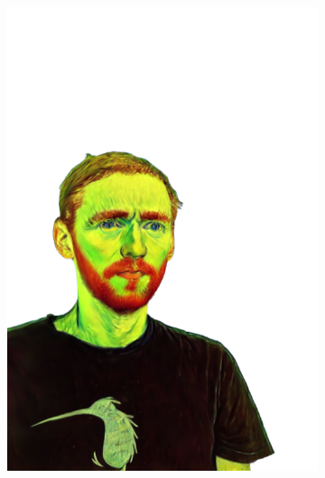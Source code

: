 \begin{figure}[ht]
\begin{subfigure}{0.08\linewidth}
        \includegraphics[width=\textwidth]{Figures/results/high/simon_vangogh/11_render.png}
	\end{subfigure}
	\begin{subfigure}{0.08\linewidth}%

\end{subfigure}
\end{figure}
